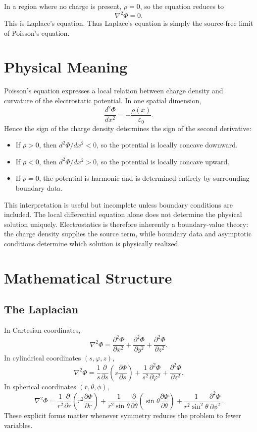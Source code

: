 \documentclass[12pt]{article}
\begin{document}
In a region where no charge is present, $\rho=0$, so the equation reduces to
\[
\nabla^2\Phi=0.
\]
This is Laplace's equation. Thus Laplace's equation is simply the source-free limit of Poisson's equation.

\section{Physical Meaning}
Poisson's equation expresses a local relation between charge density and curvature of the electrostatic potential. In one spatial dimension,
\[
\frac{d^2\Phi}{dx^2}=-\frac{\rho(x)}{\varepsilon_0}.
\]
Hence the sign of the charge density determines the sign of the second derivative:
\begin{itemize}
\item If $\rho>0$, then $d^2\Phi/dx^2<0$, so the potential is locally concave downward.
\item If $\rho<0$, then $d^2\Phi/dx^2>0$, so the potential is locally concave upward.
\item If $\rho=0$, the potential is harmonic and is determined entirely by surrounding boundary data.
\end{itemize}

This interpretation is useful but incomplete unless boundary conditions are included. The local differential equation alone does not determine the physical solution uniquely. Electrostatics is therefore inherently a boundary-value theory: the charge density supplies the source term, while boundary data and asymptotic conditions determine which solution is physically realized.

\section{Mathematical Structure}

\subsection{The Laplacian}
In Cartesian coordinates,
\[
\nabla^2\Phi=
\frac{\partial^2\Phi}{\partial x^2}
+
\frac{\partial^2\Phi}{\partial y^2}
+
\frac{\partial^2\Phi}{\partial z^2}.
\]
In cylindrical coordinates $(s,\varphi,z)$,
\[
\nabla^2\Phi=
\frac{1}{s}\frac{\partial}{\partial s}\left(s\frac{\partial \Phi}{\partial s}\right)
+
\frac{1}{s^2}\frac{\partial^2\Phi}{\partial \varphi^2}
+
\frac{\partial^2\Phi}{\partial z^2}.
\]
In spherical coordinates $(r,\theta,\phi)$,
\[
\nabla^2\Phi=
\frac{1}{r^2}\frac{\partial}{\partial r}\left(r^2\frac{\partial\Phi}{\partial r}\right)
+
\frac{1}{r^2\sin\theta}\frac{\partial}{\partial\theta}\left(\sin\theta\frac{\partial\Phi}{\partial\theta}\right)
+
\frac{1}{r^2\sin^2\theta}\frac{\partial^2\Phi}{\partial\phi^2}.
\]
These explicit forms matter whenever symmetry reduces the problem to fewer variables.
\end{document}
